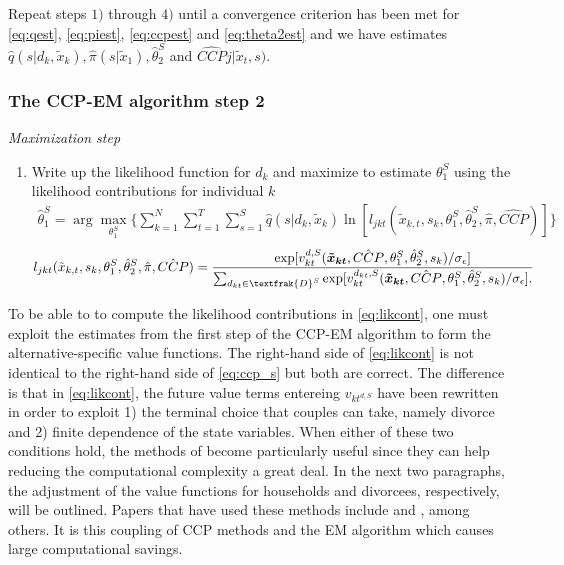 Repeat steps $1)$ through $4)$ until a convergence criterion has been met for \eqref{eq:qest}, \eqref{eq:piest}, \eqref{eq:ccpest} and \eqref{eq:theta2est} and we have estimates $\hat{q}(s|d_k,\tilde{x}_k),\hat{\pi}(s|\tilde{x}_1),\hat{\theta}_2^{S}$ and $\hat{CCP}{j|\tilde{x}_{t},s})$.

\subsubsection{The CCP-EM algorithm step 2}
\textit{Maximization step}
\begin{enumerate}
\item Write up the likelihood function for $d_k$ and maximize to estimate $\theta_1^{S}$ using the likelihood contributions for individual $k$
\begin{align}
\hat{\theta}_1^{S}=\arg\max_{\theta_1^S}{ \{ \sum_{k=1}^N{\sum_{t=1}^T{\sum_{s=1}^S}} }{\hat{q}(s|d_k,\tilde{x}_k)\ln[l_{jkt}(\tilde{x}_{k,t},s_{k},\theta_1^S,\hat{\theta}_2^S,\hat{\pi},\hat{CCP})]\}}
\label{eq:theta1est}
\end{align}
\begin{align}
l_{jkt}(\tilde{x}_{k,t},s_{k},\theta_1^S,\hat{\theta}_2^S,\hat{\pi},\hat{CCP})=\frac{\exp[v_{kt}^{d,S}(\boldsymbol{\tilde{x}_{kt}},\hat{CCP},\theta_1^S,\hat{\theta}_2^S,s_k)/ \sigma_{\epsilon}]}{\sum_{d_{kt} \in \textfrak{D}^S} { \exp[v_{kt}^{d_{kt},S}(\boldsymbol{\tilde{x}_{kt}},\hat{CCP},\theta_1^S,\hat{\theta}_2^S,s_k)/ \sigma_{\epsilon}].  }}
\label{eq:likcont}
\end{align}
\end{enumerate}

To be able to to compute the likelihood contributions in \eqref{eq:likcont}, one must exploit the estimates from the first step of the CCP-EM algorithm to form the alternative-specific value functions. The right-hand side of \eqref{eq:likcont} is not identical to the right-hand side of \eqref{eq:ccp_s} but both are correct. The difference is that in \eqref{eq:likcont}, the future value terms entereing $v_{kt^{d,S}}$ have been rewritten in order to exploit 1) the terminal choice that couples can take, namely divorce and 2) finite dependence of the state variables. When either of these two conditions hold, the methods of \cite{ArcidiaconoMiller2011} become particularly useful since they can help reducing the computational complexity a great deal. In the next two paragraphs, the adjustment of the value functions for households and divorcees, respectively, will be outlined. Papers that have used these methods include \cite{Bishop2012} and \cite{JoensenMattana2017}, among others. It is this coupling of CCP methods and the EM algorithm which causes large computational savings. 

